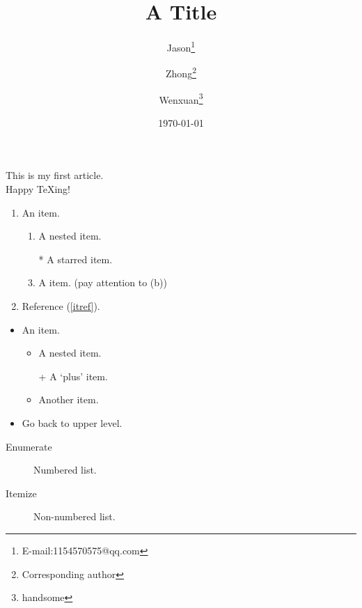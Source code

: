 \documentclass{article}
\title{A Title}
\author{ Jason\thanks{E-mail:1154570575@qq.com}
  \and Zhong\thanks{Corresponding author}
  \and Wenxuan\thanks{handsome}}
\date{\today}
\begin{document}
\maketitle
This is my first article.\\
Happy \TeX ing!
\begin{enumerate}
  \item An item.
        \begin{enumerate}
          \item A nested item.\label{itref}
          \item[*] A starred item.
          \item A item. (pay attention to (b))
        \end{enumerate}
  \item Reference (\ref{itref}).

\end{enumerate}
\begin{itemize}
  \item An item.
        \begin{itemize}
          \item A nested item.
          \item[+] A `plus' item.
          \item Another item.
        \end{itemize}
  \item Go back to upper level.
\end{itemize}
\begin{description}
  \item[Enumerate] Numbered list.
  \item[Itemize] Non-numbered list.
\end{description}
\end{document}

